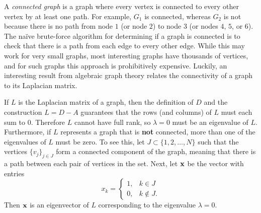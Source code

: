 A \emph{connected graph} is a graph where every vertex is connected to every other vertex by at least one path.
For example, $G_1$ is connected, whereas $G_2$ is not because there is no path from node $1$ (or node $2$) to node $3$ (or nodes $4$, $5$, or $6$).
The na\"ive brute-force algorithm for determining if a graph is connected is to check that there is a path from each edge to every other edge.
While this may work for very small graphs, most interesting graphs have thousands of vertices, and for such graphs this approach is prohibitively expensive.
Luckily, an interesting result from algebraic graph theory relates the connectivity of a graph to its Laplacian matrix.

If $L$ is the Laplacian matrix of a graph, then the definition of $D$ and the construction $L = D - A$ guarantees that the rows (and columns) of $L$ must each sum to $0$.
Therefore $L$ cannot have full rank, so $\lambda = 0$ must be an eigenvalue of $L$.
Furthermore, if $L$ represents a graph that is \textbf{not} connected, more than one of the eigenvalues of $L$ must be zero.
To see this, let $J \subset \{1,2,\ldots,N\}$ such that the vertices $\{v_j\}_{j \in J}$ form a connected component of the graph, meaning that there is a path between each pair of vertices in the set.
Next, let $\mathbf{x}$ be the vector with entries
 \[
x_k = \begin{cases}
1, & k \in J    \\
0, & k \not\in J.
\end{cases}
  \]
Then $\mathbf{x}$ is an eigenvector of $L$ corresponding to the eigenvalue $\lambda = 0$.

